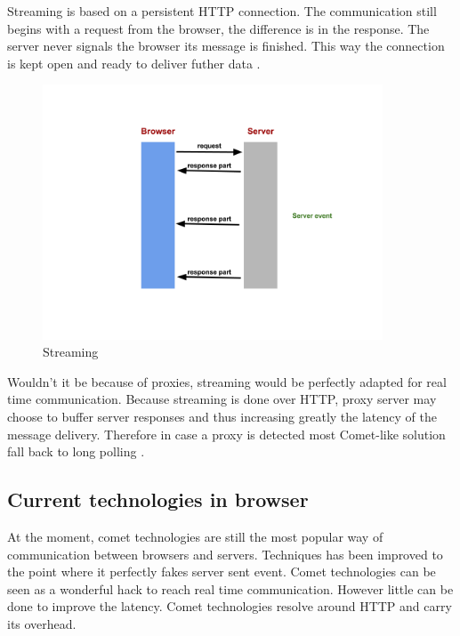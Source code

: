 Streaming is based on a persistent HTTP connection. The communication still
begins with a request from the browser, the difference is in the response. The
server never signals the browser its message is finished. This way the
connection is kept open and ready to deliver futher data \citep{Reference2}.\\

\begin{figure}[H]
\centering
\includegraphics[width=0.9\textwidth]{./Figures/streaming.png}
\caption[Streaming]{Streaming}
\label{fig:streaming}
\end{figure}

Wouldn't it be because of proxies, streaming would be perfectly adapted for
real time communication. Because streaming is done over HTTP, proxy server may
choose to buffer server responses and thus increasing greatly the latency of
the message delivery. Therefore in case a proxy is detected most Comet-like
solution fall back to long polling \citep{Reference2}.\\

\subsection{Current technologies in browser}

At the moment, comet technologies are still the most popular way of
communication between browsers and servers. Techniques has been improved to
the point where it perfectly fakes server sent event. Comet technologies can be
seen as a wonderful hack to reach real time communication. However little can
be done to improve the latency. Comet technologies resolve around HTTP and
carry its overhead.\\

